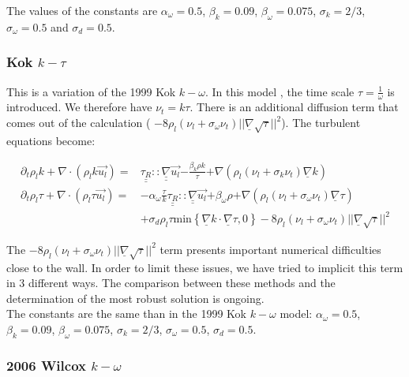 The values of the constants are	$\alpha_{\omega} = 0.5$, $\beta_{k} = 0.09$, $\beta_{\omega} = 0.075$, $\sigma_k = 2/3$, $\sigma_{\omega} = 0.5$ and $\sigma_d = 0.5$.

\subsubsection{Kok $k-\tau$}

This is a variation of the 1999 Kok $k-\omega$. In this model \cite{Ktau2000}, the time scale $\tau = \frac{1}{\omega}$ is introduced. We therefore have $\nu_t = k\tau$. There is an additional diffusion term that comes out of the calculation ( $- 8  \rho_l(\nu_l + \sigma_{\omega} \nu_t) ||\underline{\nabla}\sqrt{\tau}||^2$). The turbulent equations become:

\begin{equation} \label{eq_tau}
\begin{split}
		\partial_t \rho_l k + \nabla \cdot ( \rho_l k \vec{u_l}) 
		= &  { \underline{\underline{\tau_R}}::\underline{\underline{\nabla}}\vec{u_l} }
		{ - \frac{\beta_{k}\rho k}{\tau} }
		{ + \nabla(  \rho_l(\nu_l + \sigma_k \nu_t) \underline{\nabla} k)}
		\\
		\partial_t  \rho_l \tau + \nabla \cdot ( \rho_l \tau \vec{u_l})
		= & { - \alpha_{\omega}  \frac{\tau}{k}\underline{\underline{\tau_R}}::\underline{\underline{\nabla}}\vec{u_l} }
		{ + \beta_{\omega}\rho }
		{ +\nabla(  \rho_l(\nu_l + \sigma_{\omega} \nu_t) \underline{\nabla} \tau)} \\
		& { + \sigma_d \rho_l \tau \text{min}\left\{\underline{\nabla}k \cdot \underline{\nabla} \tau, 0\right\} }
		- 8  \rho_l(\nu_l + \sigma_{\omega} \nu_t) ||\underline{\nabla}\sqrt{\tau}||^2
\end{split}
\end{equation}

The $- 8  \rho_l(\nu_l + \sigma_{\omega} \nu_t) ||\underline{\nabla}\sqrt{\tau}||^2$ term presents important numerical difficulties close to the wall. In order to limit these issues, we have tried to implicit this term in 3 different ways. The comparison between these methods and the determination of the most robust solution is ongoing.\\

The constants are the same than in the 1999 Kok $k-\omega$ model: $\alpha_{\omega} = 0.5$, $\beta_{k} = 0.09$, $\beta_{\omega} = 0.075$, $\sigma_k = 2/3$, $\sigma_{\omega} = 0.5$, $\sigma_d = 0.5$.

\subsubsection{2006 Wilcox $k-\omega$}

